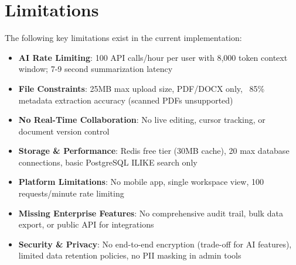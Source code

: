 \section{Limitations}
\label{sec:limitations}

The following key limitations exist in the current implementation:

\begin{itemize}
    \item \textbf{AI Rate Limiting}: 100 API calls/hour per user with 8,000 token context window; 7-9 second summarization latency
    
    \item \textbf{File Constraints}: 25MB max upload size, PDF/DOCX only, ~85\% metadata extraction accuracy (scanned PDFs unsupported)
    
    \item \textbf{No Real-Time Collaboration}: No live editing, cursor tracking, or document version control
    
    \item \textbf{Storage \& Performance}: Redis free tier (30MB cache), 20 max database connections, basic PostgreSQL ILIKE search only
    
    \item \textbf{Platform Limitations}: No mobile app, single workspace view, 100 requests/minute rate limiting
    
    \item \textbf{Missing Enterprise Features}: No comprehensive audit trail, bulk data export, or public API for integrations
    
    \item \textbf{Security \& Privacy}: No end-to-end encryption (trade-off for AI features), limited data retention policies, no PII masking in admin tools
\end{itemize}
